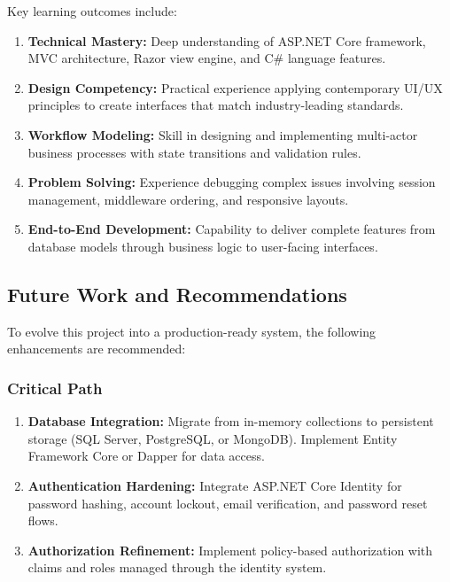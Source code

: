 \documentclass[12pt,a4paper]{article}
\begin{document}
Key learning outcomes include:

\begin{enumerate}[leftmargin=*]
    \item \textbf{Technical Mastery:} Deep understanding of ASP.NET Core framework, MVC architecture, Razor view engine, and C\# language features.
    
    \item \textbf{Design Competency:} Practical experience applying contemporary UI/UX principles to create interfaces that match industry-leading standards.
    
    \item \textbf{Workflow Modeling:} Skill in designing and implementing multi-actor business processes with state transitions and validation rules.
    
    \item \textbf{Problem Solving:} Experience debugging complex issues involving session management, middleware ordering, and responsive layouts.
    
    \item \textbf{End-to-End Development:} Capability to deliver complete features from database models through business logic to user-facing interfaces.
\end{enumerate}

\subsection{Future Work and Recommendations}

To evolve this project into a production-ready system, the following enhancements are recommended:

\subsubsection{Critical Path}

\begin{enumerate}[leftmargin=*]
    \item \textbf{Database Integration:} Migrate from in-memory collections to persistent storage (SQL Server, PostgreSQL, or MongoDB). Implement Entity Framework Core or Dapper for data access.
    
    \item \textbf{Authentication Hardening:} Integrate ASP.NET Core Identity for password hashing, account lockout, email verification, and password reset flows.
    
    \item \textbf{Authorization Refinement:} Implement policy-based authorization with claims and roles managed through the identity system.
\end{enumerate}
\end{document}
